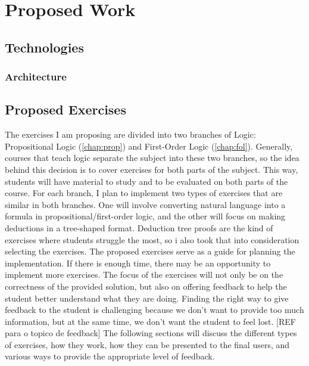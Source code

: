
%

\chapter{Proposed Work}

\section{Technologies}
\subsection{Architecture}

\section{Proposed Exercises}

The exercises I am proposing are divided into two branches of Logic: Propositional Logic (\ref{chap:prop}) and First-Order Logic (\ref{chap:fol}). Generally, courses that teach logic separate the subject into these two branches, so the idea behind this decision is to cover exercises for both parts of the subject. This way, students will have material to study and to be evaluated on both parts of the course. For each branch, I plan to implement two types of exercises that are similar in both branches. One will involve converting natural language into a formula in propositional/first-order logic, and the other will focus on making deductions in a tree-shaped format. Deduction tree proofs are the kind of exercises where students struggle the most, so i also took that into consideration selecting the exercises. The proposed exercises serve as a guide for planning the implementation. If there is enough time, there may be an opportunity to implement more exercises. The focus of the exercises will not only be on the correctness of the provided solution, but also on offering feedback to help the student better understand what they are doing. Finding the right way to give feedback to the student is challenging because we don’t want to provide too much information, but at the same time, we don’t want the student to feel lost. [REF para o topico de feedback]
The following sections will discuss the different types of exercises, how they work, how they can be presented to the final users, and various ways to provide the appropriate level of feedback.

